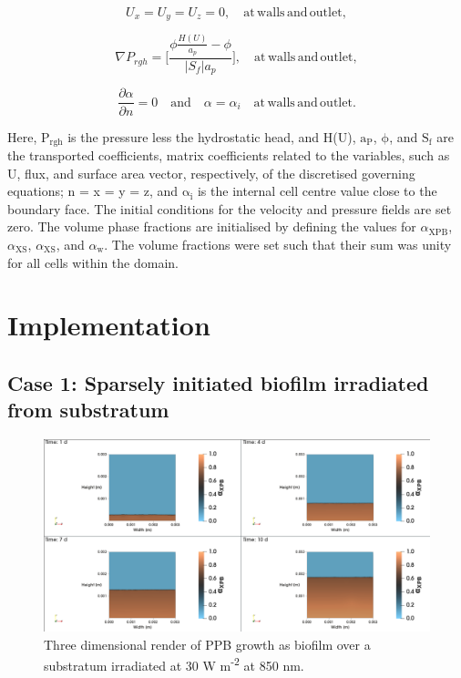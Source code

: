 \begin{equation}
    \label{eq:boundaryU}
    U_x = U_y = U_z = 0, \quad \mathrm{at \, walls\, and\, outlet},
\end{equation}

\begin{equation}
    \label{eq:boundaryPrgh}
    \nabla P_{rgh} = \bigg[\frac{\phi \frac{H(U)}{a_p} - \phi}{|S_f|a_p} \bigg], \quad \mathrm{at \, walls\, and\, outlet},
\end{equation}

\begin{equation}
    \label{eq:boundaryAlpha}
    \frac{\partial \alpha}{\partial n} = 0 \quad \mathrm{and} \quad \alpha = \alpha_i \quad \mathrm{at \, walls\, and\, outlet}.
\end{equation}

Here, $\mathrm{P_{rgh}}$ is the pressure less the hydrostatic head, and H(U), $\mathrm{a_P}$, $\mathrm{\phi}$, and $\mathrm{S_f}$ are the transported coefficients, matrix coefficients related to the variables, such as U, flux, and surface area vector, respectively, of the discretised governing equations; n = x = y = z, and $\mathrm{\alpha_i}$ is the internal cell centre value close to the boundary face. The initial conditions for the velocity and pressure fields are set zero. The volume phase fractions are initialised by defining the values for $\alpha_{\mathrm{XPB}}$, $\alpha_{\mathrm{XS}}$, $\alpha_{\mathrm{XS}}$, and $\alpha_{\mathrm{w}}$. The volume fractions were set such that their sum was unity for all cells within the domain. 


\section{Implementation}

\subsection{Case 1: Sparsely initiated biofilm irradiated from substratum}
\begin{figure}[H]
    \centering
    \includegraphics[width=\textwidth,height=0.4\textheight]{Chap4/results/post_processing/2D_cases/case1_ppb.png}
    \caption{Three dimensional render of PPB growth as biofilm over a substratum irradiated at 30 W m\textsuperscript{-2} at 850 nm. } 
    \label{fig:case5_alpha_distro}
\end{figure}


